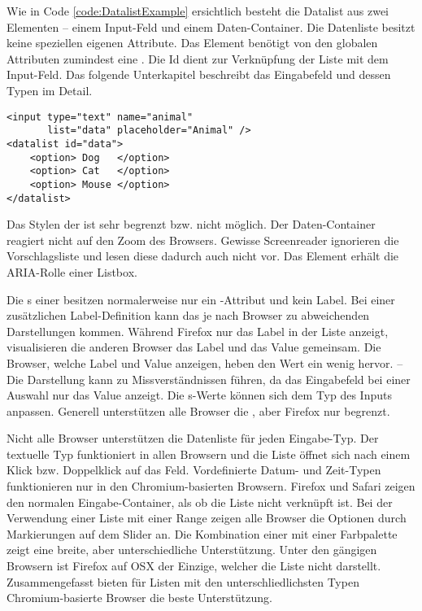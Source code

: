 Wie in Code \ref{code:DatalistExample} ersichtlich besteht die Datalist aus zwei Elementen – einem Input-Feld und einem Daten-Container. 
Die Datenliste besitzt keine speziellen eigenen Attribute.
Das Element benötigt von den globalen Attributen zumindest eine .
Die Id dient zur Verknüpfung der Liste mit dem Input-Feld. 
Das folgende Unterkapitel \textbf{} beschreibt das Eingabefeld und dessen Typen im Detail.

\begin{lstlisting}[style = htmlcssjs, caption = Datalist Beispiel, label = code:DatalistExample]
<input type="text" name="animal" 
       list="data" placeholder="Animal" />
<datalist id="data">
    <option> Dog   </option>
    <option> Cat   </option>
    <option> Mouse </option>
</datalist>
\end{lstlisting}

Das Stylen der  ist sehr begrenzt bzw. nicht möglich. 
Der Daten-Container reagiert nicht auf den Zoom des Browsers.
Gewisse Screenreader ignorieren die Vorschlagsliste und lesen diese dadurch auch nicht vor.
Das Element erhält die ARIA-Rolle einer Listbox.

Die s einer  besitzen normalerweise nur ein -Attribut und kein Label.
Bei einer zusätzlichen Label-Definition kann das je nach Browser zu abweichenden Darstellungen kommen. 
Während Firefox nur das Label in der Liste anzeigt, visualisieren die anderen Browser das Label und das Value gemeinsam.
Die Browser, welche Label und Value anzeigen, heben den Wert ein wenig hervor.
--
Die Darstellung kann zu Missverständnissen führen, da das Eingabefeld bei einer Auswahl nur das Value anzeigt. 
Die s-Werte können sich dem Typ des Inputs anpassen. 
Generell unterstützen alle Browser die , aber Firefox nur begrenzt.

Nicht alle Browser unterstützen die Datenliste für jeden Eingabe-Typ.
Der textuelle Typ funktioniert in allen Browsern und die Liste öffnet sich nach einem Klick bzw. Doppelklick auf das Feld.
Vordefinierte Datum- und Zeit-Typen funktionieren nur in den Chromium-basierten Browsern. 
Firefox und Safari zeigen den normalen Eingabe-Container, als ob die Liste nicht verknüpft ist.
Bei der Verwendung einer Liste mit einer Range zeigen alle Browser die Optionen durch Markierungen auf dem Slider an.
Die Kombination einer  mit einer Farbpalette zeigt eine breite, aber unterschiedliche Unterstützung. 
Unter den gängigen Browsern ist Firefox auf OSX der Einzige, welcher die Liste nicht darstellt.
Zusammengefasst bieten für Listen mit den unterschliedlichsten Typen Chromium-basierte Browser die beste Unterstützung.


